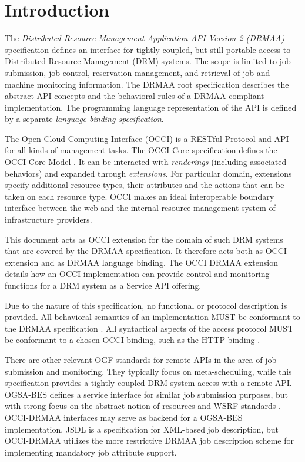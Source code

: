 \documentclass[10pt]{article}
\begin{document}
\section{Introduction}
\label{sec:introduction}

 The \emph{Distributed Resource Management Application API Version 2 (DRMAA)} specification defines an interface for tightly coupled, but still portable access to Distributed Resource Management (DRM) systems. The scope is limited to job submission, job control, reservation management, and retrieval of job and machine monitoring information. The DRMAA root specification \cite{gfd194} describes the abstract API concepts and the behavioral rules of a DRMAA-compliant implementation. The programming language representation of the API is defined by a separate \emph{language binding specification}.  
 
The Open Cloud Computing Interface (OCCI) is a RESTful Protocol and API for all kinds of management tasks. The OCCI Core specification defines the OCCI Core Model \cite{gfd183}. It can be interacted with \emph{renderings} (including associated behaviors) and expanded through \emph{extensions}. For particular domain, extensions specify additional resource types, their attributes and the actions that can be taken on each resource type. OCCI makes an ideal interoperable boundary interface between the web and the internal resource management system of infrastructure providers.

This document acts as OCCI extension for the domain of such DRM systems that are covered by the DRMAA specification. It therefore acts both as OCCI extension and as DRMAA language binding. The OCCI DRMAA extension details how an OCCI implementation can provide control and monitoring functions for a DRM system as a Service API offering.  

Due to the nature of this specification, no functional or protocol description is provided. All behavioral semantics of an implementation MUST be conformant to the DRMAA specification \cite{gfd194}. All syntactical aspects of the access protocol MUST be conformant to a chosen OCCI binding, such as the HTTP binding \cite{gfd185}.

There are other relevant OGF standards for remote APIs in the area of job submission and monitoring. They typically focus on meta-scheduling, while this specification provides a tightly coupled DRM system access with a remote API. OGSA-BES \cite{citemaster_498} defines a service interface for similar job submission purposes, but with strong focus on the abstract notion of resources and WSRF standards \cite{stateful-wsrf}. OCCI-DRMAA interfaces may serve as backend for a OGSA-BES implementation. JSDL \cite{citemaster_428} is a specification for XML-based job description, but OCCI-DRMAA utilizes the more restrictive DRMAA job description scheme for implementing mandatory job attribute support.   
\end{document}
